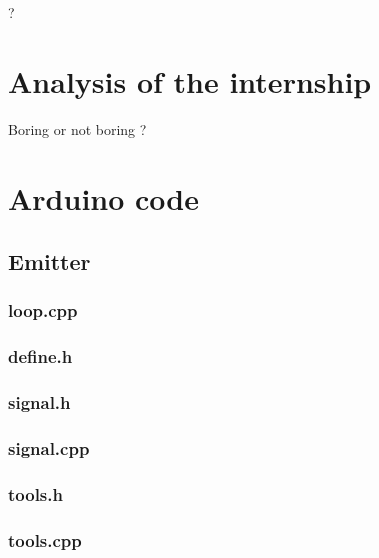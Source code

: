 \documentclass[12pt]{report}
\begin{document}
?



\chapter{Analysis of the internship}

Boring or not boring ?



\appendix

\chapter{Arduino code}

\section{Emitter}

\subsection{loop.cpp}



\subsection{define.h}



\subsection{signal.h}



\subsection{signal.cpp}



\subsection{tools.h}



\subsection{tools.cpp}
\end{document}
